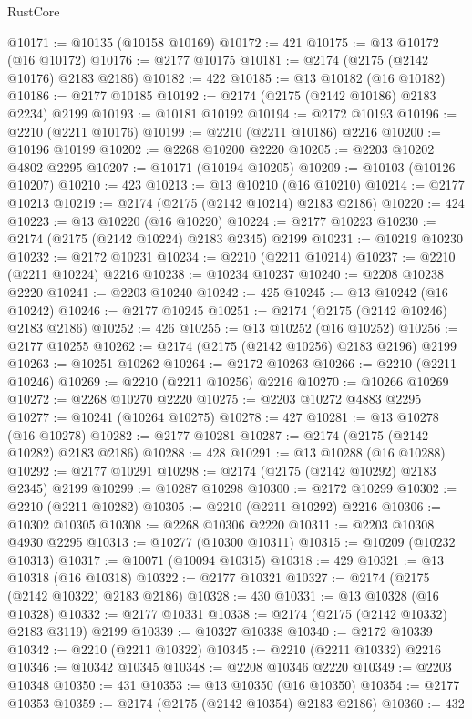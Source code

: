 \begin{lexlean}{RustCore}
\begin{coremodule}
@10171 := @10135 (@10158 @10169)
@10172 := 421
@10175 := @13 @10172 (@16 @10172)
@10176 := @2177 @10175
@10181 := @2174 (@2175 (@2142 @10176) @2183 @2186)
@10182 := 422
@10185 := @13 @10182 (@16 @10182)
@10186 := @2177 @10185
@10192 := @2174 (@2175 (@2142 @10186) @2183 @2234) @2199
@10193 := @10181 @10192
@10194 := @2172 @10193
@10196 := @2210 (@2211 @10176)
@10199 := @2210 (@2211 @10186) @2216
@10200 := @10196 @10199
@10202 := @2268 @10200 @2220
@10205 := @2203 @10202 @4802 @2295
@10207 := @10171 (@10194 @10205)
@10209 := @10103 (@10126 @10207)
@10210 := 423
@10213 := @13 @10210 (@16 @10210)
@10214 := @2177 @10213
@10219 := @2174 (@2175 (@2142 @10214) @2183 @2186)
@10220 := 424
@10223 := @13 @10220 (@16 @10220)
@10224 := @2177 @10223
@10230 := @2174 (@2175 (@2142 @10224) @2183 @2345) @2199
@10231 := @10219 @10230
@10232 := @2172 @10231
@10234 := @2210 (@2211 @10214)
@10237 := @2210 (@2211 @10224) @2216
@10238 := @10234 @10237
@10240 := @2208 @10238 @2220
@10241 := @2203 @10240
@10242 := 425
@10245 := @13 @10242 (@16 @10242)
@10246 := @2177 @10245
@10251 := @2174 (@2175 (@2142 @10246) @2183 @2186)
@10252 := 426
@10255 := @13 @10252 (@16 @10252)
@10256 := @2177 @10255
@10262 := @2174 (@2175 (@2142 @10256) @2183 @2196) @2199
@10263 := @10251 @10262
@10264 := @2172 @10263
@10266 := @2210 (@2211 @10246)
@10269 := @2210 (@2211 @10256) @2216
@10270 := @10266 @10269
@10272 := @2268 @10270 @2220
@10275 := @2203 @10272 @4883 @2295
@10277 := @10241 (@10264 @10275)
@10278 := 427
@10281 := @13 @10278 (@16 @10278)
@10282 := @2177 @10281
@10287 := @2174 (@2175 (@2142 @10282) @2183 @2186)
@10288 := 428
@10291 := @13 @10288 (@16 @10288)
@10292 := @2177 @10291
@10298 := @2174 (@2175 (@2142 @10292) @2183 @2345) @2199
@10299 := @10287 @10298
@10300 := @2172 @10299
@10302 := @2210 (@2211 @10282)
@10305 := @2210 (@2211 @10292) @2216
@10306 := @10302 @10305
@10308 := @2268 @10306 @2220
@10311 := @2203 @10308 @4930 @2295
@10313 := @10277 (@10300 @10311)
@10315 := @10209 (@10232 @10313)
@10317 := @10071 (@10094 @10315)
@10318 := 429
@10321 := @13 @10318 (@16 @10318)
@10322 := @2177 @10321
@10327 := @2174 (@2175 (@2142 @10322) @2183 @2186)
@10328 := 430
@10331 := @13 @10328 (@16 @10328)
@10332 := @2177 @10331
@10338 := @2174 (@2175 (@2142 @10332) @2183 @3119) @2199
@10339 := @10327 @10338
@10340 := @2172 @10339
@10342 := @2210 (@2211 @10322)
@10345 := @2210 (@2211 @10332) @2216
@10346 := @10342 @10345
@10348 := @2208 @10346 @2220
@10349 := @2203 @10348
@10350 := 431
@10353 := @13 @10350 (@16 @10350)
@10354 := @2177 @10353
@10359 := @2174 (@2175 (@2142 @10354) @2183 @2186)
@10360 := 432

\end{coremodule}
\end{lexlean}
